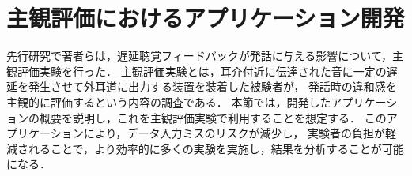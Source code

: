 \section{主観評価におけるアプリケーション開発}
先行研究\cite{cf:kayama}で著者らは，遅延聴覚フィードバックが発話に与える影響について，主観評価実験を行った．
主観評価実験とは，耳介付近に伝達された音に一定の遅延を発生させて外耳道に出力する装置を装着した被験者が，
発話時の違和感を主観的に評価するという内容の調査である．
本節では，開発したアプリケーションの概要を説明し，これを主観評価実験で利用することを想定する．
このアプリケーションにより，データ入力ミスのリスクが減少し，
実験者の負担が軽減されることで，より効率的に多くの実験を実施し，結果を分析することが可能になる．
